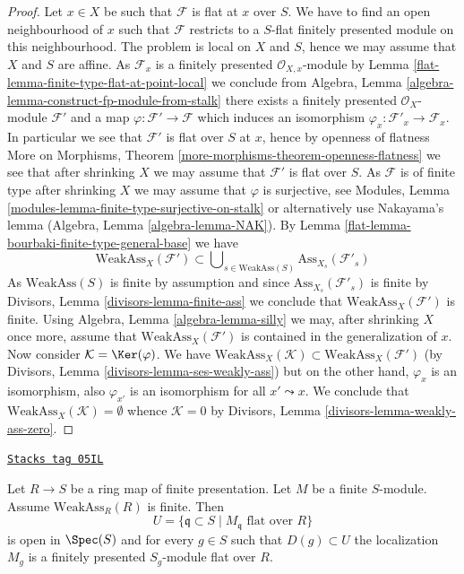 \begin{proof}

Let $x \in X$ be such that $\mathcal{F}$ is flat at $x$ over $S$.
We have to find an open neighbourhood of $x$ such that $\mathcal{F}$ restricts
to a $S$-flat finitely presented module on this neighbourhood.
The problem is local on $X$ and $S$, hence we may assume that $X$ and $S$
are affine. As $\mathcal{F}_x$ is a finitely presented
$\mathcal{O}_{X, x}$-module by
Lemma \ref{flat-lemma-finite-type-flat-at-point-local}
we conclude from
Algebra, Lemma \ref{algebra-lemma-construct-fp-module-from-stalk}
there exists a finitely presented $\mathcal{O}_X$-module $\mathcal{F}'$
and a map $\varphi : \mathcal{F}' \to \mathcal{F}$ which induces
an isomorphism $\varphi_x : \mathcal{F}'_x \to \mathcal{F}_x$. In particular
we see that $\mathcal{F}'$ is flat over $S$ at $x$, hence by openness
of flatness
More on Morphisms, Theorem \ref{more-morphisms-theorem-openness-flatness}
we see that after shrinking $X$ we may assume that
$\mathcal{F}'$ is flat over $S$. As $\mathcal{F}$ is of finite type
after shrinking $X$ we may assume that $\varphi$ is surjective, see
Modules, Lemma \ref{modules-lemma-finite-type-surjective-on-stalk}
or alternatively use Nakayama's lemma
(Algebra, Lemma \ref{algebra-lemma-NAK}).
By
Lemma \ref{flat-lemma-bourbaki-finite-type-general-base}
we have
$$
\text{WeakAss}_X(\mathcal{F}') \subset
\bigcup\nolimits_{s \in \text{WeakAss}(S)} \text{Ass}_{X_s}(\mathcal{F}'_s)
$$
As $\text{WeakAss}(S)$ is finite by assumption and since
$\text{Ass}_{X_s}(\mathcal{F}'_s)$ is finite by
Divisors, Lemma \ref{divisors-lemma-finite-ass}
we conclude that $\text{WeakAss}_X(\mathcal{F}')$ is finite. Using
Algebra, Lemma \ref{algebra-lemma-silly}
we may, after shrinking $X$ once more, assume that
$\text{WeakAss}_X(\mathcal{F}')$ is contained in the generalization
of $x$. Now consider $\mathcal{K} = \Ker(\varphi)$. We have
$\text{WeakAss}_X(\mathcal{K}) \subset \text{WeakAss}_X(\mathcal{F}')$
(by
Divisors, Lemma \ref{divisors-lemma-ses-weakly-ass})
but on the other hand, $\varphi_x$ is an isomorphism, also $\varphi_{x'}$
is an isomorphism for all $x' \leadsto x$. We conclude that
$\text{WeakAss}_X(\mathcal{K}) = \emptyset$ whence
$\mathcal{K} = 0$ by
Divisors, Lemma \ref{divisors-lemma-weakly-ass-zero}.
\end{proof}

\begin{lemma}
\label{flat-lemma-finite-type-flat-algebra}
\href{https://stacks.math.columbia.edu/tag/05IL}{\texttt{Stacks tag 05IL}}

Let $R \to S$ be a ring map of finite presentation.
Let $M$ be a finite $S$-module. Assume $\text{WeakAss}_R(R)$ is finite.
Then
$$
U = \{\mathfrak q \subset S \mid M_{\mathfrak q}\text{ flat over }R\}
$$
is open in $\Spec(S)$ and for every $g \in S$ such that
$D(g) \subset U$ the localization $M_g$ is a finitely presented
$S_g$-module flat over $R$.
\end{lemma}


